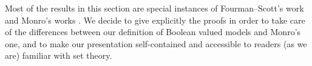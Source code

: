 \documentclass[11pt]{amsart}
\newcommand{\LL}{\mathcal{L}}
\newcommand{\F}{\mathcal{F}}
\theoremstyle{plain}
\theoremstyle{definition}
\theoremstyle{plain}
\theoremstyle{remark}
\newcommand{\M}{\mathcal{M}}
\DeclareMathOperator{\St}{St}
\newcommand{\bool}[1]{\mathsf{#1}}
\newcommand{\bp}[1]{\left\lbrace #1 \right\rbrace}
\newcommand{\0}{\mathsf{0}}
\renewcommand{\1}{\mathsf{1}}
\renewcommand{\2}{\mathsf{2}}
\theoremstyle{definition}
\begin{document}
Most of the results in this section are special instances of Fourman--Scott's work \cite{FOURSCOTT} and Monro's works \cite{MONROBIS, MONRO86}. We decide to give explicitly the proofs in order to take care of the differences between our definition of Boolean valued models and Monro's one, and to make our presentation self-contained and accessible to readers  (as we are) familiar with set theory.


\end{document}

